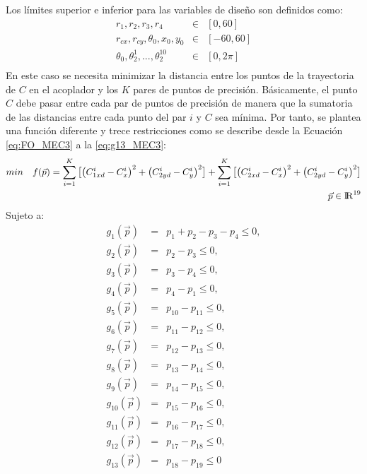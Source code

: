 Los límites superior e inferior para las variables de diseño son definidos como:
\begin{eqnarray}\label{eq:limites variables MEC3}
r_1,r_2,r_3,r_4& \in & \left[ 0,60\right] \\
r_{cx},r_{cy},\theta_0,x_0,y_0 & \in & \left[ -60,60\right] \\
\theta_0,\theta^1_2,...,\theta^{10}_2& \in & \left[ 0,2\pi \right] \\
\end{eqnarray}
 En este caso se necesita minimizar la distancia entre los puntos de la trayectoria de $C$ en el acoplador y los $K$ pares de puntos de precisión. Básicamente, el punto $C$ debe pasar entre cada par de puntos de precisión de manera que la sumatoria de las distancias entre cada punto del par $i$ y $C$ sea mínima. Por tanto, se plantea una función diferente y trece restricciones como se describe desde la Ecuación \ref{eq:FO_MEC3} a la \ref{eq:g13_MEC3}:
 \begin{equation}\label{eq:FO_MEC3}
 \begin{aligned}
min\quad  f(\vec{p})=
\sum_{i=1}^{K}\big[\big(C^{i}_{1xd}-C^{i}_{x} \big)^2 +\big(C^{i}_{2yd}-C^{i}_{y} \big)^2\big]+\sum_{i=1}^{K}\big[\big(C^{i}_{2xd}-C^{i}_{x} \big)^2 +\big(C^{i}_{2yd}-C^{i}_{y} \big)^2\big]
\\
\vec{p} \in  {\rm I\!R}^{19}
\end{aligned}
\end{equation}
Sujeto a:
\begin{eqnarray}\label{eq:Restricciones MEC3}
g_{1}(\vec{p})&=&p_{1}+ p_{2}-p_{3}-p_{4} \leq 0,\\
g_{2}(\vec{p})&=&p_{2}-p_{3} \leq 0,\\
g_{3}(\vec{p})&=&p_{3}-p_{4} \leq 0,\\
g_{4}(\vec{p})&=&p_{4}-p_{1} \leq 0,\\
g_{5}(\vec{p})&=&p_{10}-p_{11} \leq 0,\\
g_{6}(\vec{p})&=&p_{11}-p_{12} \leq 0,\\
g_{7}(\vec{p})&=&p_{12}-p_{13} \leq 0,\\
g_{8}(\vec{p})&=&p_{13}-p_{14} \leq 0,\\
g_{9}(\vec{p})&=&p_{14}-p_{15} \leq 0,\\
g_{10}(\vec{p})&=&p_{15}-p_{16} \leq 0,\\
g_{11}(\vec{p})&=&p_{16}-p_{17} \leq 0,\\
g_{12}(\vec{p})&=&p_{17}-p_{18} \leq 0,\\
g_{13}(\vec{p})&=&p_{18}-p_{19} \leq 0 \label{eq:g13_MEC3}
\end{eqnarray}



